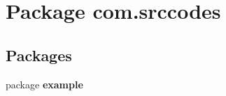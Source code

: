 \section{Package com.\-srccodes}
\label{namespacecom_1_1srccodes}
\subsection*{Packages}
\begin{DoxyCompactItemize}
\item 
package {\bf example}
\end{DoxyCompactItemize}
